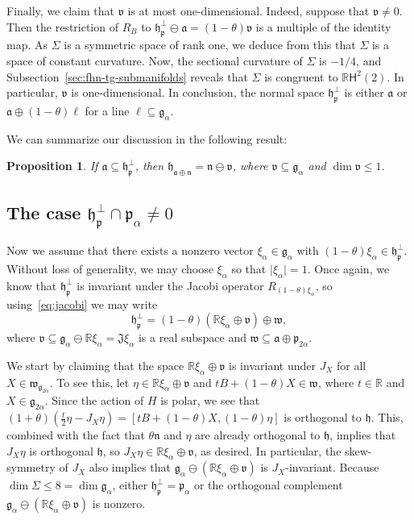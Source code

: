 \documentclass[12pt, a4paper]{amsart}
\newcommand{\g}{\mathfrak}
\newcommand{\s}{\mathsf}
\newcommand{\R}{\mathbb{R}}
\newtheorem{proposition}[theorem]{Proposition}
\theoremstyle{definition}
\begin{document}
Finally, we claim that $\g{v}$ is at most one-dimensional.
Indeed, suppose that $\g{v}\neq 0$.
Then the restriction of $R_{B}$ to $\g{h}_{\g{p}}^\perp\ominus \g{a}=(1-\theta)\g{v}$ is a multiple of the identity map.
As $\Sigma$ is a symmetric space of rank one, we deduce from this that $\Sigma$ is a space of constant curvature.
Now, the sectional curvature of $\Sigma$ is $-{1}/{4}$, and Subsection~\ref{sec:fhn-tg-submanifolds} reveals that $\Sigma$ is congruent to $\R\s{H}^2(2)$.
In particular, $\g{v}$ is one-dimensional.
In conclusion, the normal space $\g{h}_{\g{p}}^\perp$ is either $\g{a}$ or $\g{a}\oplus(1-\theta)\ell$ for a line $\ell\subseteq \g{g}_\alpha$.

We can summarize our discussion in the following result:

\begin{proposition}\label{prop:case-a-conclusion}
If $\g{a}\subseteq \g{h}_{\g{p}}^\perp $, then $\g{h}_{\g{a}\oplus\g{n}}=\g{n}\ominus\g{v}$, 
where $\g{v}\subseteq \g{g}_\alpha$ and $\dim \g{v}\leq 1$.
\end{proposition}

\subsection{The case $\g{h}_{\g{p}}^\perp\cap\g{p}_\alpha\neq 0$}\hfill

Now we assume that there exists a nonzero vector $\xi_\alpha\in\g{g}_\alpha$ with $(1-\theta)\xi_\alpha\in \g{h}_{\g{p}}^\perp$.
Without loss of generality, we may choose $\xi_\alpha$ so that $\lvert \xi_\alpha \rvert = 1$.
Once again, we know that $\g{h}_{\g{p}}^\perp$ is invariant under the Jacobi operator $R_{(1-\theta)\xi_\alpha}$, so using~\eqref{eq:jacobi} we may write
\begin{equation*}
	\g{h}_{\g{p}}^\perp=(1-\theta)(\R\xi_\alpha\oplus\g{v})\oplus \g{w},
\end{equation*}
where $\g{v}\subseteq \g{g}_\alpha\ominus \R \xi_\alpha=\g{J}\xi_\alpha$ is a real subspace and $\g{w}\subseteq \g{a}\oplus\g{p}_{2\alpha}$.

We start by claiming that the space $\R\xi_\alpha\oplus\g{v}$ is invariant under $J_X$ for all $X\in\g{w}_{\g{g}_{2\alpha}}$.
To see this, let $\eta\in\R\xi_\alpha\oplus\g{v}$ and $t B+(1-\theta)X\in\g{w}$, where $t\in \R$ and $X\in\g{g}_{2\alpha}$.
Since the action of $H$ is polar, we see that $(1+\theta)(\tfrac{t}{2}\eta-J_X\eta)=[t B+(1-\theta)X,(1-\theta)\eta]$ is orthogonal to $\g{h}$.
This, combined with the fact that $\theta\g{n}$ and $\eta$ are already orthogonal to $\g{h}$, implies that $J_X\eta$ is orthogonal $\g{h}$, so $J_X \eta\in\R \xi_\alpha \oplus \g{v}$, as desired.
In particular, the skew-symmetry of $J_X$ also implies that $\g{g}_{\alpha}\ominus(\R\xi_\alpha\oplus\g{v})$ is $J_X$-invariant.
Because $\dim\Sigma\leq8=\dim\g{g}_\alpha$, either $\g{h}_{\g{p}}^\perp=\g{p}_\alpha$ or the orthogonal complement $\g{g}_\alpha\ominus(\R\xi_\alpha\oplus\g{v})$ is nonzero.
\end{document}
